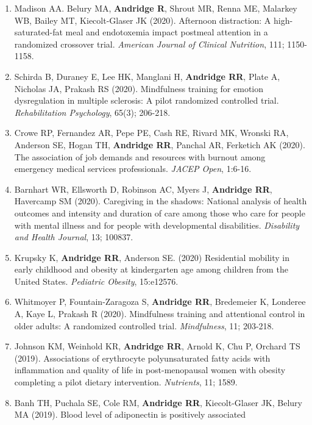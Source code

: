 \documentclass[
  english,
  letterpaper,
  DIV=11,
  numbers=noendperiod]{scrartcl}
\begin{document}
\begin{enumerate}
  epigenetic age and p16INK4a with markers of T-cell composition in a
  healthy cohort. \emph{The Journals of Gerontology: Series A}, 75(12);
  2299-2303.
\item
  Madison AA. Belury MA, \textbf{Andridge R}, Shrout MR, Renna ME,
  Malarkey WB, Bailey MT, Kiecolt-Glaser JK (2020). Afternoon
  distraction: A high-saturated-fat meal and endotoxemia impact postmeal
  attention in a randomized crossover trial. \emph{American Journal of
  Clinical Nutrition}, 111; 1150-1158.
\item
  Schirda B, Duraney E, Lee HK, Manglani H, \textbf{Andridge RR}, Plate
  A, Nicholas JA, Prakash RS (2020). Mindfulness training for emotion
  dysregulation in multiple sclerosis: A pilot randomized controlled
  trial. \emph{Rehabilitation Psychology}, 65(3); 206-218.
\item
  Crowe RP, Fernandez AR, Pepe PE, Cash RE, Rivard MK, Wronski RA,
  Anderson SE, Hogan TH, \textbf{Andridge RR}, Panchal AR, Ferketich AK
  (2020). The association of job demands and resources with burnout
  among emergency medical services professionals. \emph{JACEP Open},
  1:6-16.
\item
  Barnhart WR, Ellsworth D, Robinson AC, Myers J, \textbf{Andridge RR},
  Havercamp SM (2020). Caregiving in the shadows: National analysis of
  health outcomes and intensity and duration of care among those who
  care for people with mental illness and for people with developmental
  disabilities. \emph{Disability and Health Journal}, 13; 100837.
\item
  Krupsky K, \textbf{Andridge RR}, Anderson SE. (2020) Residential
  mobility in early childhood and obesity at kindergarten age among
  children from the United States. \emph{Pediatric Obesity}, 15:e12576.
\item
  Whitmoyer P, Fountain-Zaragoza S, \textbf{Andridge RR}, Bredemeier K,
  Londeree A, Kaye L, Prakash R (2020). Mindfulness training and
  attentional control in older adults: A randomized controlled trial.
  \emph{Mindfulness}, 11; 203-218.
\item
  Johnson KM, Weinhold KR, \textbf{Andridge RR}, Arnold K, Chu P,
  Orchard TS (2019). Associations of erythrocyte polyunsaturated fatty
  acids with inflammation and quality of life in post-menopausal women
  with obesity completing a pilot dietary intervention.
  \emph{Nutrients}, 11; 1589.
\item
  Banh TH, Puchala SE, Cole RM, \textbf{Andridge RR}, Kiecolt-Glaser JK,
  Belury MA (2019). Blood level of adiponectin is positively associated

\end{enumerate}
\end{document}
